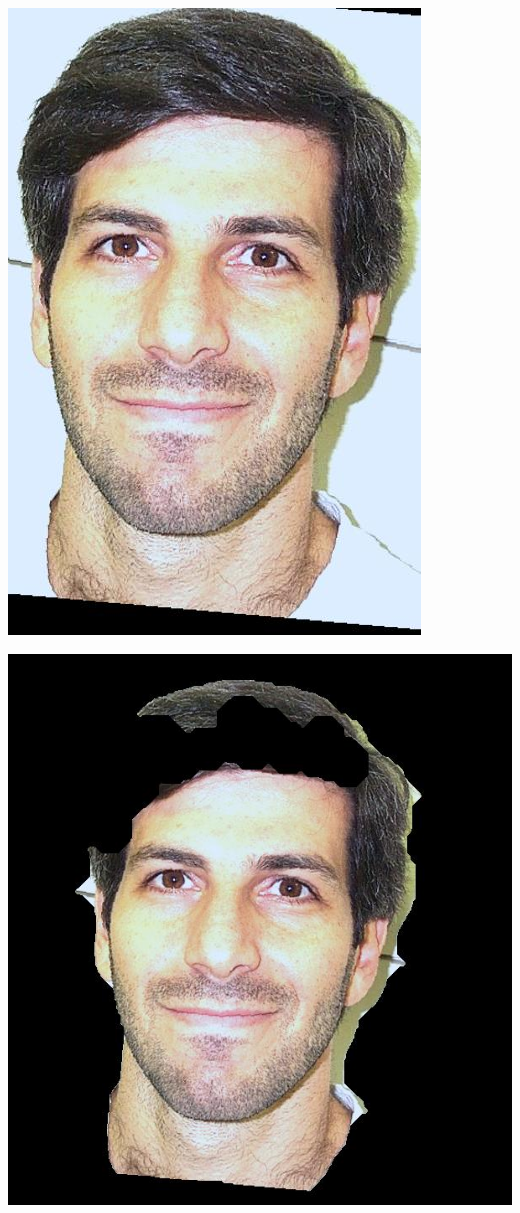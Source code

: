 \begin{Figure}
  \centering
    \includegraphics[width=0.5\columnwidth]{im9_cropped.jpg}
\end{Figure}

\begin{Figure}
  \centering
    \includegraphics[width=0.5\columnwidth]{im9_mask.jpg}
\end{Figure}

